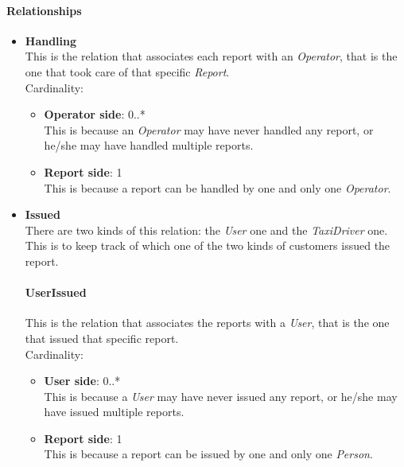 \paragraph{Relationships} %
\label{par:relations}
\begin{itemize}
	\item {\textbf{Handling}} \\
		This is the relation that associates each report with an \emph{Operator}, that is the one that took care of that specific \emph{Report}.\\Cardinality: 
		\begin{itemize}
			\item {\textbf{Operator side}}: 0..* \\
				This is because an \emph{Operator} may have never handled any report, or he/she may have handled multiple reports.
			\item {\textbf{Report side}}: 1 \\
				This is because a report can be handled by one and only one \emph{Operator}.
		\end{itemize}
	\item {\textbf{Issued}} \\
		There are two kinds of this relation: the \emph{User} one and the \emph{TaxiDriver} one.
		This is to keep track of which one of the two kinds of customers issued the report.
		\paragraph{UserIssued} %
		\label{par:userissued}
		This is the relation that associates the reports with a \emph{User}, that is the one that issued that specific report.\\Cardinality: 
			\begin{itemize}
				\item {\textbf{User side}}: 0..* \\
					This is because a \emph{User} may have never issued any report, or he/she may have issued multiple reports.
				\item {\textbf{Report side}}: 1 \\
					This is because a report can be issued by one and only one \emph{Person}.
			\end{itemize}


\end{itemize}
